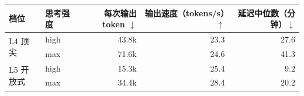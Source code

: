 \begin{tabular}{@{}llrrr@{}}
\toprule
档位 & 思考强度 & 每次输出 token $\downarrow$ & 输出速度（tokens/s）$\uparrow$ & 延迟中位数（分钟）$\downarrow$ \\
\midrule
\multirow{2}{*}{L4 顶尖} & high & 43.8k & 23.3 & 27.6 \\
 & max & 71.6k & 24.6 & 41.3 \\
\cmidrule(lr){1-5}
\multirow{2}{*}{L5 开放式} & high & 15.3k & 25.4 & 9.2 \\
 & max & 34.4k & 28.4 & 20.2 \\
\bottomrule
\end{tabular}
